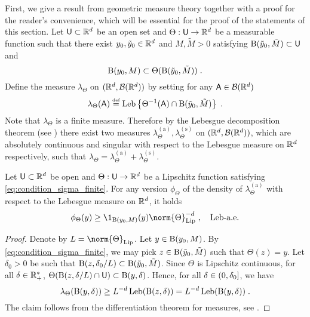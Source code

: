 First, we give  a result  from geometric measure
theory together with a proof for the reader's convenience, which will be essential for the proof of the statements of this section.  Let
$\mathsf{U}\subset\mathbb{R}^d$ be an open set and $\Theta: \mathsf{U}\to \mathbb{R}^d$ be
a measurable function such that there exist $y_0 , \tilde{y}_0 \in \mathbb{R}^d$ and
$M, \tilde{M} > 0$ satisfying $\operatorname{B}(\tilde{y}_0,\tilde{M}) \subset \mathsf{U}$ and
  \begin{equation}
    \label{eq:condition_sigma_finite}
\operatorname{B}(y_0,M) \subset \Theta(\operatorname{B}(\tilde{y}_0,\tilde{M})) \;.
  \end{equation}
 Define the measure $\lambda_{\Theta}$ on $(\mathbb{R}^d,\mathcal{B}(\mathbb{R}^d))$
  by setting for any $\mathsf{A} \in \mathcal{B}(\mathbb{R}^d)$
\begin{equation}
  \label{eq:push_forward_mes}
\lambda_\Theta (\mathsf{A}) \overset{\text{\tiny def}} = \operatorname{Leb}\left\lbrace \Theta^{-1}(\mathsf{A}) \cap \operatorname{B}(\tilde{y}_0,\tilde{M}) \right\rbrace  \;.
\end{equation}
Note %
that $\lambda_\Theta$ is  a finite measure. Therefore by the Lebesgue decomposition theorem (see
\cite[Section 6.10]{rudin:1987}) there exist two  measures
$\lambda_\Theta^{(\text{a})}, \lambda_\Theta^{(\text{s})}$ on
$(\mathbb{R}^d,\mathcal{B}(\mathbb{R}^d))$, which are absolutely continuous and
singular with respect to the Lebesgue measure on $\mathbb{R}^d$
respectively, such that $\lambda_\Theta = \lambda_\Theta^{(\text{a})} +
\lambda_\Theta^{(\text{s})}$.
\begin{proposition}\label{le:simple}
  Let $\mathsf{U}\subset\mathbb{R}^d$ be open and $\Theta: \mathsf{U}\to \mathbb{R}^d$ be a Lipschitz function
  satisfying \eqref{eq:condition_sigma_finite}.
 For any version  $\phi_\Theta$ of the density of $\lambda_\Theta^{(\text{a})}$ with respect to the Lebesgue
  measure on $\mathbb{R}^d$, it holds
$$
\phi_\Theta(y)\geq \1_{ \ball{y_0}{M}}(y) \norm{\Theta}_{\Lip}^{-d}\eqsp, \quad \text{$\Leb$-a.e.}
$$
\end{proposition}
\begin{proof}
  Denote by $L = \norm{\Theta}_{\Lip}$. Let $y\in \operatorname{B}(y_0,M)$. By  \eqref{eq:condition_sigma_finite}, we may pick
  $z \in \operatorname{B}(\tilde{y}_0,\tilde{M})$ such that $\Theta(z) = y$. Let
  $\delta_0 >0$ be such that $\operatorname{B}(z,\delta_0/L) \subset
  \operatorname{B}(\tilde{y}_0,\tilde{M})$.  Since $\Theta$ is
  Lipschitz continuous,  for all
  $\delta \in \mathbb{R}_+^*$,
  $\Theta(\operatorname{B}(z,\delta/L) \cap \mathsf{U})\subset \operatorname{B}(y,\delta)$. Hence, for all
  $\delta \in \left(0,\delta_0\right]$, we have
  $$
\lambda_\Theta(\operatorname{B}(y,\delta))\geq
  L^{-d}\operatorname{Leb}(\operatorname{B}(z,\delta)) =   L^{-d}\operatorname{Leb}(\operatorname{B}(y,\delta)) \;.
$$
 The claim follows from the differentiation theorem
  for measures, see \cite[Theorem 7.14]{rudin:1987}.
\end{proof}

